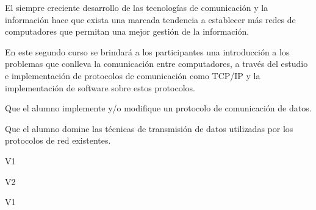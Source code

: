 \begin{syllabus}


\begin{justification}
El siempre creciente desarrollo de las tecnologías de comunicación y la
información hace que exista una marcada tendencia a  establecer
más redes de computadores que permitan una mejor
gestión de la información.

En este segundo curso se brindará a los participantes una introducción a los
problemas que conlleva la comunicación entre computadores, a través del
estudio e implementación de protocolos de comunicación como TCP/IP y
la implementación de software sobre estos protocolos.
\end{justification}

\begin{goals}
\item Que el alumno implemente y/o modifique un protocolo de comunicación de datos.
\item Que el alumno domine las técnicas de transmisión de datos utilizadas por los protocolos de red existentes.
\end{goals}

\begin{outcomes}{V1}
    \item {}
    \item {}
    \item {}
\end{outcomes}

\begin{outcomes}{V2}
    \item {}
    \item {}
    \item {}
\end{outcomes}

\begin{competences}{V1}
    \item {}
    \item {}
    \item {}
    \item {}
    \item {}
    \item {}
    \item {}
\end{competences}


\end{syllabus}
